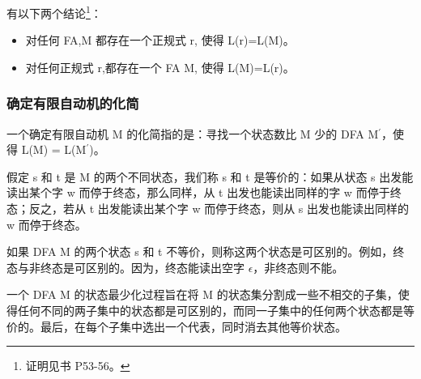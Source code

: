 有以下两个结论\footnote{证明见书 P53-56。}：
\begin{itemize}
    \item 对任何 FA,M 都存在一个正规式 r, 使得 L(r)=L(M)。
    \item 对任何正规式 r,都存在一个 FA M, 使得 L(M)=L(r)。
\end{itemize}

\subsubsection{确定有限自动机的化简}

一个确定有限自动机 M 的化简指的是：寻找一个状态数比 M 少的 DFA M$^{'}$，使得 L(M) = L(M$^{'}$)。

假定 s 和 t 是 M 的两个不同状态，我们称 s 和 t 是等价的：如果从状态 s 出发能读出某个字 w 而停于终态，那么同样，从 t 出发也能读出同样的字 w 而停于终态；反之，若从 t 出发能读出某个字 w 而停于终态，则从 s 出发也能读出同样的 w 而停于终态。

如果 DFA M 的两个状态 s 和 t 不等价，则称这两个状态是可区别的。例如，终态与非终态是可区别的。因为，终态能读出空字 $\epsilon$，非终态则不能。

一个 DFA M 的状态最少化过程旨在将 M 的状态集分割成一些不相交的子集，使得任何不同的两子集中的状态都是可区别的，而同一子集中的任何两个状态都是等价的。最后，在每个子集中选出一个代表，同时消去其他等价状态。
















\newpage